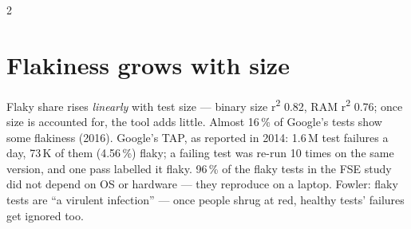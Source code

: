 \documentclass[8pt]{extarticle}
\begin{document}
\begin{multicols}{2}
\raggedright
\footnotesize{}

\section{Flakiness grows with size}
\noindent{}\par
Flaky share rises \emph{linearly} with test size — binary size r\textsuperscript{2} 0.82, RAM
r\textsuperscript{2} 0.76; once size is accounted for, the tool adds little. Almost 16\,\% of
Google's tests show some flakiness (2016). Google's TAP, as reported in 2014: 1.6\,M test
failures a day, 73\,K of them (4.56\,\%) flaky; a failing test was re-run 10 times on the same
version, and one pass labelled it flaky. 96\,\% of the flaky tests in the FSE study did not
depend on OS or hardware — they reproduce on a laptop. Fowler: flaky tests are ``a virulent
infection'' — once people shrug at red, healthy tests' failures get ignored too.


\end{multicols}
\end{document}
